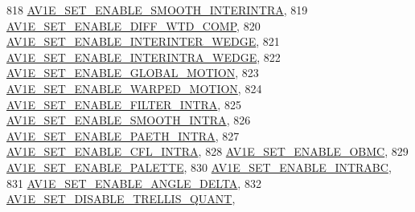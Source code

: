 \begin{DoxyCodeInclude}
{{{{{{{818                                         \hyperlink{group__aom__encoder_ggae78dde67a6d78f332e9bdba0dde42db5aa15748a927789e02f586d2408eaa78fe}{AV1E\_SET\_ENABLE\_SMOOTH\_INTERINTRA},
819                                         \hyperlink{group__aom__encoder_ggae78dde67a6d78f332e9bdba0dde42db5a951b38c88fb632d63568da3cce275ecd}{AV1E\_SET\_ENABLE\_DIFF\_WTD\_COMP},
820                                         \hyperlink{group__aom__encoder_ggae78dde67a6d78f332e9bdba0dde42db5a013aa12c1a51471d2f2f401d6abcb40d}{AV1E\_SET\_ENABLE\_INTERINTER\_WEDGE},
821                                         \hyperlink{group__aom__encoder_ggae78dde67a6d78f332e9bdba0dde42db5a8b3e315575be2741071813f5a3830b79}{AV1E\_SET\_ENABLE\_INTERINTRA\_WEDGE},
822                                         \hyperlink{group__aom__encoder_ggae78dde67a6d78f332e9bdba0dde42db5ad4da3bb77e25bac4a0afc2135617cbd9}{AV1E\_SET\_ENABLE\_GLOBAL\_MOTION},
823                                         \hyperlink{group__aom__encoder_ggae78dde67a6d78f332e9bdba0dde42db5a4c4ae7f4158f795667b16c99fcdc5dd3}{AV1E\_SET\_ENABLE\_WARPED\_MOTION},
824                                         \hyperlink{group__aom__encoder_ggae78dde67a6d78f332e9bdba0dde42db5a9774262de47ffd2bb7d674bb55951a7e}{AV1E\_SET\_ENABLE\_FILTER\_INTRA},
825                                         \hyperlink{group__aom__encoder_ggae78dde67a6d78f332e9bdba0dde42db5a0a1d54150968c5c20b410bc29dc0caa4}{AV1E\_SET\_ENABLE\_SMOOTH\_INTRA},
826                                         \hyperlink{group__aom__encoder_ggae78dde67a6d78f332e9bdba0dde42db5a25f7c646aaec0702964c1fb1bf16e298}{AV1E\_SET\_ENABLE\_PAETH\_INTRA},
827                                         \hyperlink{group__aom__encoder_ggae78dde67a6d78f332e9bdba0dde42db5a993e0e437aa0d152fe654ba0ab46f9d2}{AV1E\_SET\_ENABLE\_CFL\_INTRA},
828                                         \hyperlink{group__aom__encoder_ggae78dde67a6d78f332e9bdba0dde42db5aa51bc0690a7d51765a01afa015ec2077}{AV1E\_SET\_ENABLE\_OBMC},
829                                         \hyperlink{group__aom__encoder_ggae78dde67a6d78f332e9bdba0dde42db5a98d0e84130317b6c072c2deac106dede}{AV1E\_SET\_ENABLE\_PALETTE},
830                                         \hyperlink{group__aom__encoder_ggae78dde67a6d78f332e9bdba0dde42db5a3e59c51f12c7350fee92c1c0d4901ab0}{AV1E\_SET\_ENABLE\_INTRABC},
831                                         \hyperlink{group__aom__encoder_ggae78dde67a6d78f332e9bdba0dde42db5a3155057080db493c868eb2d42d435b61}{AV1E\_SET\_ENABLE\_ANGLE\_DELTA},
832                                         \hyperlink{group__aom__encoder_ggae78dde67a6d78f332e9bdba0dde42db5a374b5581d0b68d5f8cc3e3f73495cfbb}{AV1E\_SET\_DISABLE\_TRELLIS\_QUANT},
}}}}}}}
\end{DoxyCodeInclude}
